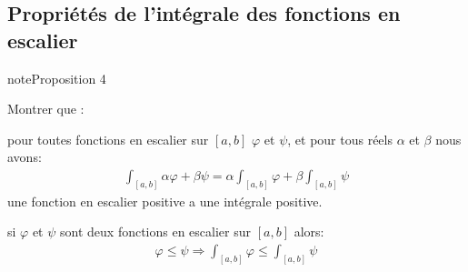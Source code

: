 \documentclass[letterpaper,10pt,french]{jupyterBook}
\begin{document}
\subsection{Propriétés de l’intégrale des fonctions en escalier}
\label{\detokenize{fe:proprietes-de-l-integrale-des-fonctions-en-escalier}}
\begin{sphinxadmonition}{note}{Proposition 4}

\sphinxAtStartPar
Montrer que :

\sphinxhyphen{} pour toutes fonctions en escalier sur \([a, b]\) \(\varphi\) et \(\psi\), et pour tous réels \(\alpha\) et \(\beta\) nous avons:
\begin{equation*}
\begin{split}
\int_{[a, b]}\alpha\varphi + \beta\psi = \alpha\int_{[a, b]}\varphi + \beta\int_{[a, b]}\psi
\end{split}
\end{equation*}
\sphinxhyphen{} une fonction en escalier positive a une intégrale positive.

\sphinxhyphen{} si  \(\varphi\) et \(\psi\) sont deux fonctions en escalier sur \([a, b]\) alors:
\begin{equation*}
\begin{split}
\varphi \leq \psi \Rightarrow  \int_{[a, b]}\varphi \leq \int_{[a, b]}\psi
\end{split}
\end{equation*}\end{sphinxadmonition}
\end{document}
